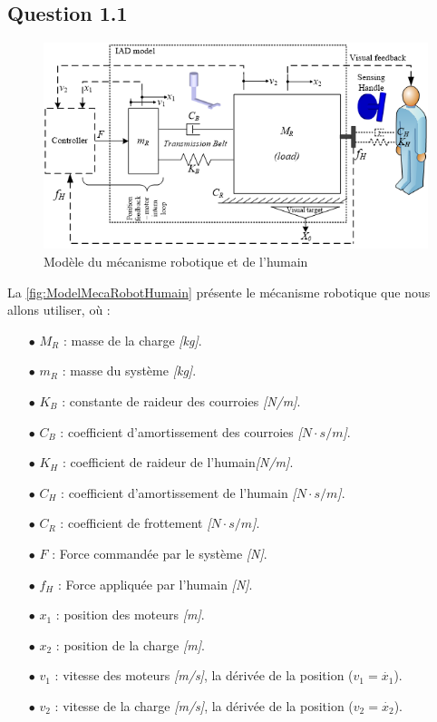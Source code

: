 \documentclass[a4paper,12pt]{article}
\begin{document}
    \subsection{Question 1.1}
    \begin{figure}[H]
        \centering
        \includegraphics[width=14cm]{./img/modele_humain-meca_robotique.png}
        \caption{
            Modèle du mécanisme robotique et de l'humain \cite{Article1} \cite{Article2}
            \label{fig:ModelMecaRobotHumain}
        }
    \end{figure}
    
    La \autoref{fig:ModelMecaRobotHumain} présente le mécanisme robotique que nous allons utiliser, où :
    \begin{itemize}
        \item[$\bullet$] $M_R$ : masse de la charge \textit{[kg]}.
        \item[$\bullet$] $m_R$ : masse du système \textit{[kg]}.
        \item[$\bullet$] $K_B$ : constante de raideur des courroies \textit{[N/m]}.
        \item[$\bullet$] $C_B$ : coefficient d'amortissement des courroies \textit{[$N\cdot s/m$]}.
        \item[$\bullet$] $K_H$ : coefficient de raideur de l'humain\textit{[N/m]}.
        \item[$\bullet$] $C_H$ : coefficient d'amortissement de l'humain \textit{[$N\cdot s/m$]}.
        \item[$\bullet$] $C_R$ : coefficient de frottement \textit{[$N\cdot s/m$]}.
        \item[$\bullet$] $F$ : Force commandée par le système \textit{[N]}.
        \item[$\bullet$] $f_H$ : Force appliquée par l'humain \textit{[N]}.
        \item[$\bullet$] $x_1$ : position des moteurs \textit{[m]}.
        \item[$\bullet$] $x_2$ : position de la charge \textit{[m]}.
        \item[$\bullet$] $v_1$ : vitesse des moteurs \textit{[m/s]}, la dérivée de la position ($v_1 = \dot{x_1}$).
        \item[$\bullet$] $v_2$ : vitesse de la charge \textit{[m/s]}, la dérivée de la position ($v_2 = \dot{x_2}$).
    \end{itemize}
    
\end{document}
